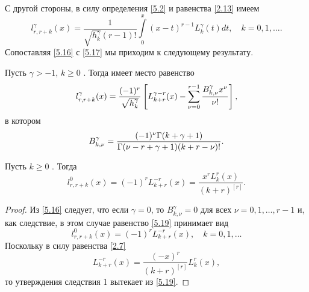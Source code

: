 С другой стороны, в силу определения \eqref{5.2} и равенства \eqref{2.13}    имеем
 \begin{equation}\label{5.17}
l_{r,r+k}^{\gamma}(x) =\frac{1}{\sqrt{h_k^\gamma}(r-1)!}\int\limits_{0}^x(x-t)^{r-1}L_{k}^{\gamma}(t)dt, \quad k=0,1,\ldots.
\end{equation}
 Сопоставляя \eqref{5.16} с \eqref{5.17} мы приходим к следующему результату.
\begin{theorem}
Пусть $\gamma>-1$, $k\ge0$ . Тогда имеет место равенство
\begin{equation}\label{5.18}
l_{r,r+k}^{\gamma}(x)=\frac{(-1)^r}{\sqrt{h_k^\gamma}}\left[L_{k+r}^{\gamma-r}(x)-
     \sum_{\nu=0}^{r-1}
{B_{k,\nu}^\gamma x^\nu\over\nu!}\right],
\end{equation}
в котором
$$
B_{k,\nu}^\gamma={(-1)^\nu\Gamma(k+\gamma+1)\over\Gamma(\nu-r+ \gamma+1)(k+r-\nu)!}.
$$
\end{theorem}

\begin{corollary}
Пусть  $k\ge0$ . Тогда
$$
l_{r,r+k}^{0}(x)=(-1)^rL_{k+r}^{-r}(x)=\frac{x^{r}L_{k}^{r}(x)}{(k+r)^{[r]}}.
$$
\end{corollary}
\begin{proof}
Из \eqref{5.16} следует, что если $\gamma=0$, то $B_{k,\nu}^\gamma=0$ для всех $\nu=0,1,\ldots, r-1$ и, как следствие, в этом случае равенство \eqref{5.19} принимает вид
\begin{equation}\label{5.19}
l_{r,r+k}^{0}(x)=(-1)^rL_{k+r}^{-r}(x),\quad k=0,1,\ldots
\end{equation}
Поскольку в силу равенства \eqref{2.7}
$$
L_{k+r}^{-r}(x) = \frac{(-x)^{r}}{(k+r)^{[r]}} L_{k}^{r}(x),
$$
то  утверждения следствия 1 вытекает  из \eqref{5.19}.
\end{proof}

